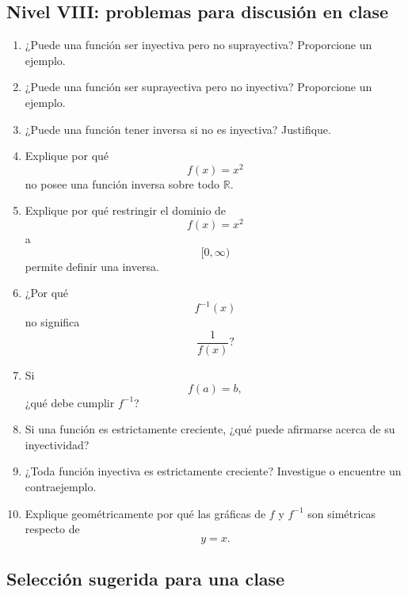 \documentclass[12pt]{article}
\theoremstyle{remark}
\begin{document}
\subsection{Nivel VIII: problemas para discusión en clase}

\begin{enumerate}

    \item
    ¿Puede una función ser inyectiva pero no suprayectiva?
    Proporcione un ejemplo.

    \item
    ¿Puede una función ser suprayectiva pero no inyectiva?
    Proporcione un ejemplo.

    \item
    ¿Puede una función tener inversa si no es inyectiva?
    Justifique.

    \item
    Explique por qué
    \[
    f(x)=x^2
    \]
    no posee una función inversa sobre todo \(\mathbb{R}\).

    \item
    Explique por qué restringir el dominio de
    \[
    f(x)=x^2
    \]
    a
    \[
    [0,\infty)
    \]
    permite definir una inversa.

    \item
    ¿Por qué
    \[
    f^{-1}(x)
    \]
    no significa
    \[
    \frac{1}{f(x)}?
    \]

    \item
    Si
    \[
    f(a)=b,
    \]
    ¿qué debe cumplir \(f^{-1}\)?

    \item
    Si una función es estrictamente creciente,
    ¿qué puede afirmarse acerca de su inyectividad?

    \item
    ¿Toda función inyectiva es estrictamente creciente?
    Investigue o encuentre un contraejemplo.

    \item
    Explique geométricamente por qué las gráficas de
    \(f\) y \(f^{-1}\) son simétricas respecto de
    \[
    y=x.
    \]
\end{enumerate}

\subsection{Selección sugerida para una clase}
\end{document}
